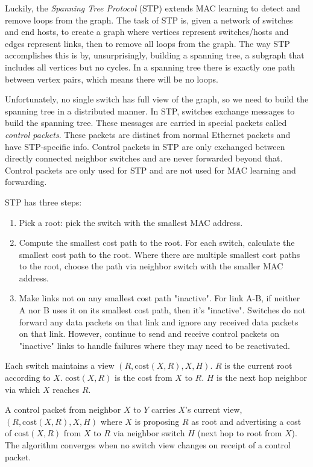 Luckily, the \emph{Spanning Tree Protocol} (STP) extends MAC learning
to detect and remove loops from the graph. The task of STP is, given
a network of switches and end hosts, to create a graph where vertices
represent switches/hosts and edges represent links, then to remove all
loops from the graph. The way STP accomplishes this is by, unsurprisingly,
building a spanning tree, a subgraph that includes all vertices but no
cycles. In a spanning tree there is exactly one path between vertex pairs,
which means there will be no loops.

Unfortunately, no single switch has full view of the graph,  so
we need to build the spanning tree in a distributed manner. In STP,
switches exchange messages to build the spanning tree. These messages
are carried in special packets called \emph{control packets}. These
packets are distinct from normal Ethernet packets and have STP-specific
info. Control packets in STP are only exchanged between directly connected
neighbor switches and are never forwarded beyond that. Control packets
are only used for STP and are not used for MAC learning and forwarding.

STP has three steps:
\begin{enumerate}
    \item Pick a root: pick the switch with the smallest MAC address.
    \item Compute the smallest cost path to the root. For each switch,
          calculate the smallest cost path to the root. Where there are
          multiple smallest cost paths to the root, choose the path via
          neighbor switch with the smaller MAC address.
    \item Make links not on any smallest cost path "inactive". For link A-B,
          if neither A nor B uses it on its smallest cost path, then it's "inactive".
          Switches do not forward any data packets on that link and ignore
          any received data packets on that link. However, continue to send
          and receive control packets on "inactive" links to handle failures where
          they may need to be reactivated.
\end{enumerate}

Each switch maintains a view $(R, \text{cost}(X, R), X, H)$.
$R$ is the current root according to $X$. $\text{cost}(X, R)$
is the cost from $X$ to $R$. $H$ is the next hop neighbor via
which $X$ reaches $R$.

A control packet from neighbor $X$ to $Y$ carries $X$'s current
view, $(R, \text{cost}(X, R), X, H)$ where $X$ is proposing $R$
as root and advertising a cost of $\text{cost}(X, R)$ from $X$
to $R$ via neighbor switch $H$ (next hop to root from $X$).
The algorithm converges when no switch view changes on
receipt of a control packet.

